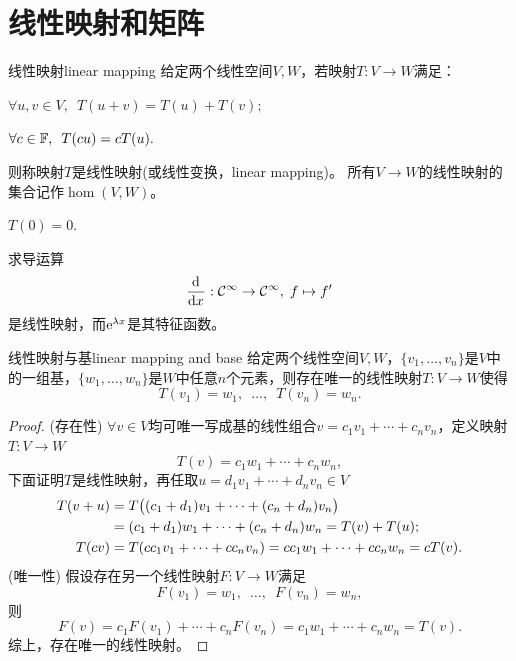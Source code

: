 \section{线性映射和矩阵}
\begin{definition}{线性映射}{linear mapping}
	给定两个线性空间$V,W$，若映射$T:V \to W$满足：
	\begin{compactenum}
		\item $\forall u,v \in V,\enspace T(u + v) = T(u) + T(v);$
		\item $\forall c \in \mathbb{F},\enspace T(cu) = cT(u).$
	\end{compactenum}
	则称映射$T$是线性映射(或线性变换，linear mapping)。
	所有$V \to W$的线性映射的集合记作$\hom(V,W)$。
\end{definition}
\begin{corollary}
	$T(0) = 0.$
\end{corollary}
\begin{example}
	{}{}
	求导运算
	\[
		\frac{\mathop{}\!\mathrm{d}^{}}{\mathrm{d}{x}^{}}:\mathcal{C}^\infty \to \mathcal{C}^\infty,\; f \mapsto f'
	\]
	是线性映射，而$\mathop{}\!\mathrm{e}^{\lambda x}$是其特征函数。
\end{example}
\begin{theorem}{线性映射与基}{linear mapping and base}
	给定两个线性空间$V,W$，$\{v_1,\ldots,v_n\}$是$V$中的一组基，$\{w_1,\ldots,w_n\}$是$W$中任意$n$个元素，则存在唯一的线性映射$T:V \to W$使得
	\begin{equation}\label{eq:la-linear-extension}
		T(v_1) = w_1,\enspace\ldots,\enspace T(v_n) = w_n.
	\end{equation}
\end{theorem}
\begin{proof}
	(存在性) $\forall v \in V$均可唯一写成基的线性组合$v = c_1v_1 + \cdots + c_nv_n$，定义映射$T:V \to W$
	\[
		T(v) = c_1w_1 + \cdots + c_nw_n,
	\]
	下面证明$T$是线性映射，再任取$u = d_1v_1 + \cdots + d_nv_n \in V$
	\begin{align*}
		T(v + u) &= T\bigl((c_1 + d_1)v_1 + \cdots + (c_n + d_n)v_n\bigr)\\
		&= (c_1 + d_1)w_1 + \cdots + (c_n + d_n)w_n = T(v) + T(u);\\
		T(cv) &= T(cc_1v_1 + \cdots + cc_nv_n) = cc_1w_1 + \cdots + cc_nw_n = cT(v).
	\end{align*}
	(唯一性) 假设存在另一个线性映射$F:V \to W$满足
	\[
		F(v_1) = w_1,\enspace\ldots,\enspace F(v_n) = w_n,
	\]
	则 
	\[
		F(v) = c_1F(v_1) + \cdots + c_nF(v_n) = c_1w_1 + \cdots + c_nw_n = T(v).
	\]
	综上，存在唯一的线性映射。
\end{proof}

